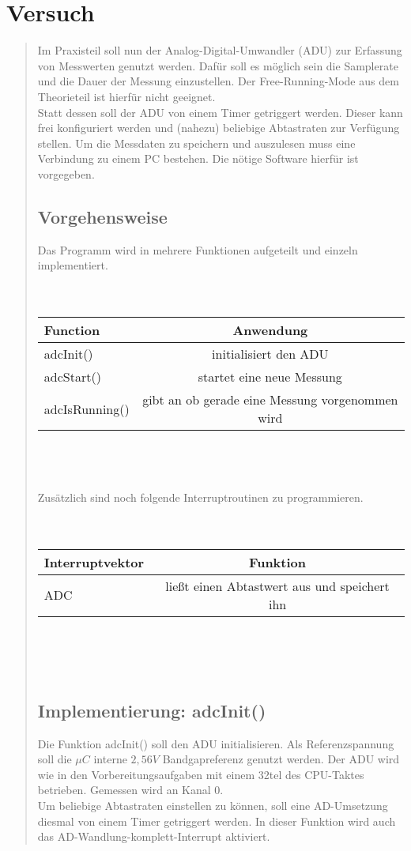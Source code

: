 \section{Versuch}
\begin{quote}
	Im Praxisteil soll nun der Analog-Digital-Umwandler (ADU) zur Erfassung von Messwerten genutzt werden. Dafür soll es möglich sein die Samplerate und die Dauer der Messung einzustellen. Der Free-Running-Mode aus dem Theorieteil ist hierfür nicht geeignet.\\ Statt dessen soll der ADU von einem Timer getriggert werden. Dieser kann frei konfiguriert werden und (nahezu) beliebige Abtastraten zur Verfügung stellen. Um die Messdaten zu speichern und auszulesen muss eine Verbindung zu einem PC bestehen. Die nötige Software hierfür ist vorgegeben.
\subsection{Vorgehensweise}
Das Programm wird in mehrere Funktionen aufgeteilt und einzeln implementiert.\\\\\\
\begin{tabular}[ht]{|l|c|}
  \hline
  Function & Anwendung\\
  \hline\hline
  adcInit() & initialisiert den ADU\\
  adcStart() & startet eine neue Messung\\
  adcIsRunning() & gibt an ob gerade eine Messung vorgenommen wird\\
  \hline
\end{tabular}\\\\\\
Zusätzlich sind noch folgende Interruptroutinen zu programmieren.\\\\\\
\begin{tabular}[ht]{|l|c|}
  \hline
  Interruptvektor & Funktion\\
  \hline\hline
 ADC & ließt einen Abtastwert aus und speichert ihn\\
  \hline
\end{tabular}\\\\\\
\subsection{Implementierung: adcInit()}
Die Funktion adcInit() soll den ADU initialisieren. Als Referenzspannung soll die $\mu C$ interne $2,56V$ Bandgapreferenz genutzt werden. Der ADU wird wie in den Vorbereitungsaufgaben mit einem 32tel des CPU-Taktes betrieben. Gemessen wird an Kanal 0.\\ Um beliebige Abtastraten einstellen zu können, soll eine AD-Umsetzung diesmal von einem Timer getriggert werden. In dieser Funktion wird auch das AD-Wandlung-komplett-Interrupt aktiviert.

\end{quote}

